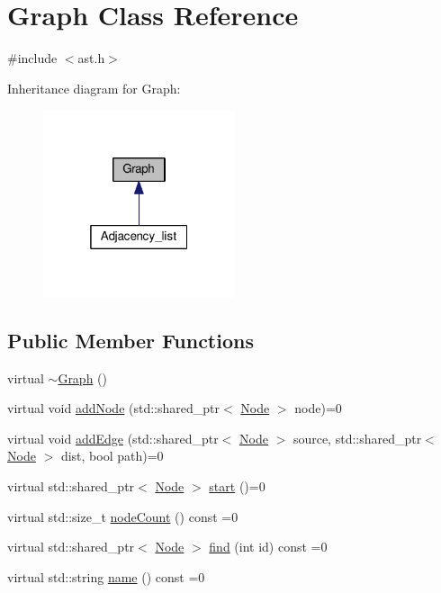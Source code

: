 \hypertarget{classGraph}{\section{Graph Class Reference}
\label{classGraph}
}


{\ttfamily \#include $<$ast.\-h$>$}



Inheritance diagram for Graph\-:
\nopagebreak
\begin{figure}[H]
\begin{center}
\leavevmode
\includegraphics[width=160pt]{classGraph__inherit__graph}
\end{center}
\end{figure}
\subsection*{Public Member Functions}
\begin{DoxyCompactItemize}
\item 
virtual \hyperlink{classGraph_a1621cd1ffcf6a135cbc7e039c305627b}{$\sim$\-Graph} ()
\item 
virtual void \hyperlink{classGraph_ae4ad7e42e8df191acd6563ca65ee779c}{add\-Node} (std\-::shared\-\_\-ptr$<$ \hyperlink{structNode}{Node} $>$ node)=0
\item 
virtual void \hyperlink{classGraph_a9e45aafa60a807245e24565baea74a39}{add\-Edge} (std\-::shared\-\_\-ptr$<$ \hyperlink{structNode}{Node} $>$ source, std\-::shared\-\_\-ptr$<$ \hyperlink{structNode}{Node} $>$ dist, bool path)=0
\item 
virtual std\-::shared\-\_\-ptr$<$ \hyperlink{structNode}{Node} $>$ \hyperlink{classGraph_a7b0c57d46c652fb12e4ca65a816f7a36}{start} ()=0
\item 
virtual std\-::size\-\_\-t \hyperlink{classGraph_afed2883e765871cc439b08d9aeba028b}{node\-Count} () const =0
\item 
virtual std\-::shared\-\_\-ptr$<$ \hyperlink{structNode}{Node} $>$ \hyperlink{classGraph_aa37e2e2fd8d7ae9a94d4e174980644c6}{find} (int id) const =0
\item 
virtual std\-::string \hyperlink{classGraph_a0d1bc2d4425ddbef019b5d7589765c5a}{name} () const =0
\end{DoxyCompactItemize}


